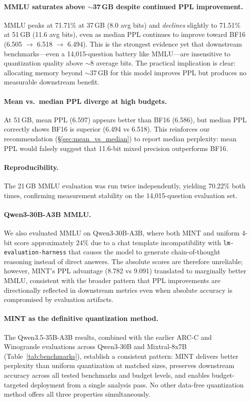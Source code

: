 \documentclass{article}
\begin{document}
\paragraph{MMLU saturates above ${\sim}$37\,GB despite continued PPL improvement.} MMLU peaks at 71.71\% at 37\,GB (8.0 avg bits) and \emph{declines} slightly to 71.51\% at 51\,GB (11.6 avg bits), even as median PPL continues to improve toward BF16 (6.505 $\rightarrow$ 6.518 $\rightarrow$ 6.494). This is the strongest evidence yet that downstream benchmarks---even a 14{,}015-question battery like MMLU---are insensitive to quantization quality above ${\sim}$8 average bits. The practical implication is clear: allocating memory beyond ${\sim}$37\,GB for this model improves PPL but produces no measurable downstream benefit.

\paragraph{Mean vs.\ median PPL diverge at high budgets.} At 51\,GB, mean PPL (6.597) appears better than BF16 (6.586), but median PPL correctly shows BF16 is superior (6.494 vs 6.518). This reinforces our recommendation (\S\ref{sec:mean_vs_median}) to report median perplexity: mean PPL would falsely suggest that 11.6-bit mixed precision outperforms BF16.

\paragraph{Reproducibility.} The 21\,GB MMLU evaluation was run twice independently, yielding 70.22\% both times, confirming measurement stability on the 14{,}015-question evaluation set.

\paragraph{Qwen3-30B-A3B MMLU.} We also evaluated MMLU on Qwen3-30B-A3B, where both MINT and uniform 4-bit score approximately 24\% due to a chat template incompatibility with \texttt{lm-evaluation-harness} that causes the model to generate chain-of-thought reasoning instead of direct answers. The absolute scores are therefore unreliable; however, MINT's PPL advantage (8.782 vs 9.091) translated to marginally better MMLU, consistent with the broader pattern that PPL improvements are directionally reflected in downstream metrics even when absolute accuracy is compromised by evaluation artifacts.

\paragraph{MINT as the definitive quantization method.} The Qwen3.5-35B-A3B results, combined with the earlier ARC-C and Winogrande evaluations across Qwen3-30B and Mixtral-8x7B (Table~\ref{tab:benchmarks}), establish a consistent pattern: MINT delivers better perplexity than uniform quantization at matched sizes, preserves downstream accuracy across all tested benchmarks and budget levels, and enables budget-targeted deployment from a single analysis pass. No other data-free quantization method offers all three properties simultaneously.
\end{document}
